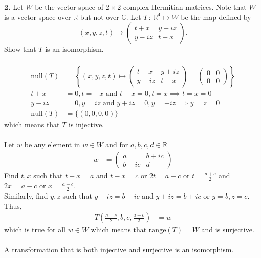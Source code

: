 \documentclass[11pt]{amsart}
\theoremstyle{definition}  %
\newcommand{\R}{\mathbb{R}}
\newcommand{\C}{\mathbb{C}}
\begin{document}
\vskip 0.1cm
\noindent 
{\bf 2.} Let $W$ be the vector space of $2 \times 2$ complex Hermitian matrices. Note that $W$ is a vector space over $\R$ but not
over $\C$. Let $T \, : \, \R^4 \mapsto W$ be the map defined by 
$$ (x,y,z,t) \mapsto \left( \begin{array}{cc} t +x & y + iz \\ y - iz & t -x \end{array} \right).$$
Show that $T$ is an isomorphism. \\
\\
\begin{align*}
	\mathrm{null}(T) &= \left \{ (x,y,z,t) \mapsto \left ( \begin{array}{cc}
		t+x& y+iz \\
		y-iz & t-x
	\end{array}\right ) = \left (\begin{array}{cc}
		0 & 0 \\
		0 & 0
	\end{array}\right ) \right \} \\
		t+x &= 0, t=-x \text{ and } t-x=0, t=x \implies t=x=0 \\
		y-iz &= 0, y=iz \text{ and } y+iz=0, y=-iz \implies y=z=0 \\
		\mathrm{null}(T) &= \{(0,0,0,0)\}
\end{align*} which means that $T$ is injective.\\
\\
Let $w$ be any element in $w \in W$ and for $a,b,c,d \in \R$
\begin{align*}
	w &= \left ( \begin{array}{cc}
		a & b+ic\\
		b-ic & d
	\end{array}\right )
\end{align*}Find $t,x$ such that $t+x=a$ and $t-x = c$  or $2t = a+c$ or $t=\frac{a+c}{2}$ and $2x=a-c$ or $x=\frac{a-c}{2}$.  \\
Similarly, find $y,z$ such that $y-iz=b-ic$ and $y+iz= b+ic$ or $y=b, z=c$.  Thus,
\begin{align*}
	T\left (\frac{a-c}{2}, b,c, \frac{a+c}{2}\right ) &= w
\end{align*}which is true for all $w \in W$ which means that $\mathrm{range}(T) = W$ and is surjective.\\
\\
A transformation that is both injective and surjective is an isomorphism.
\\
\end{document}
